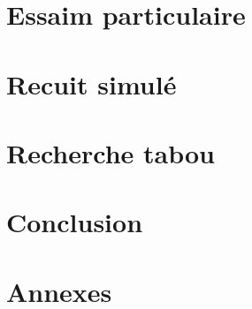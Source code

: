 \documentclass{librairies/lib}
\begin{document}
    


    \newpage

    \section{Essaim particulaire}\label{sec:essaim-particulaire}

    


    \newpage

    \section{Recuit simulé}\label{sec:recuit-simule}

    


    \newpage

    \section{Recherche tabou}\label{sec:recherche-tabou}

    


    \newpage



    \section{Conclusion}\label{sec:conclusion}

    

    \newpage




    \section*{Annexes}





    \printglossaries


    \newpage

    \listoffigures


    \newpage

    \listoftables

    \newpage



    
    
\end{document}
